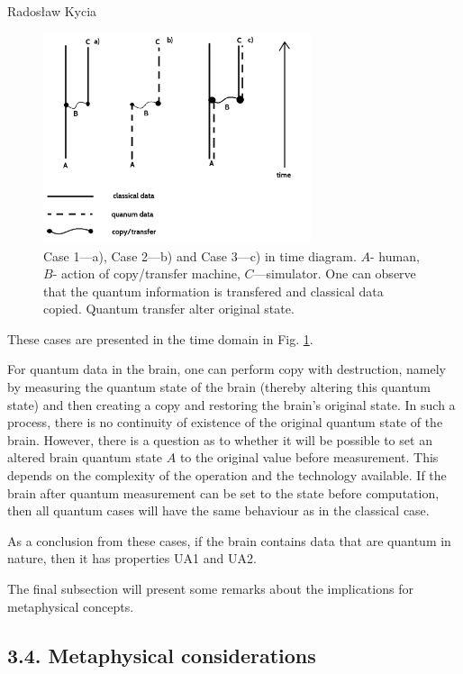 \begin{artengenv}{Radosław Kycia}
\begin{figure}
\centering
 \includegraphics[width=0.7\textwidth]{kycia/TimeDiagram2.png}
 \caption{Case 1---a), Case 2---b) and Case 3---c) in time diagram. $A$- human, $B$- action of copy/transfer machine, $C$---simulator. One can observe that the quantum information is transfered and classical data copied. Quantum transfer alter original state.}
 \label{Fig.TimeDiagram}
\end{figure}
These cases are presented in the time domain in Fig. \ref{Fig.TimeDiagram}.


For quantum data in the brain, one can perform copy with destruction, namely by measuring the quantum state of the brain (thereby altering this quantum state) and then creating a copy and restoring the brain's original state. In such a process, there is no continuity of existence of the original quantum state of the brain. However, there is a question as to whether it will be possible to set an altered brain quantum state $A$ to the original value before measurement. This depends on the complexity of the operation and the technology available. If the brain after quantum measurement can be set to the state before computation, then all quantum cases will have the same behaviour as in the classical case. 


As a conclusion from these cases, if the brain contains data that are quantum in nature, then it has properties UA1 and UA2.


The final subsection will present some remarks about the implications for metaphysical concepts.

\subsection{3.4. Metaphysical considerations}


\end{artengenv}
